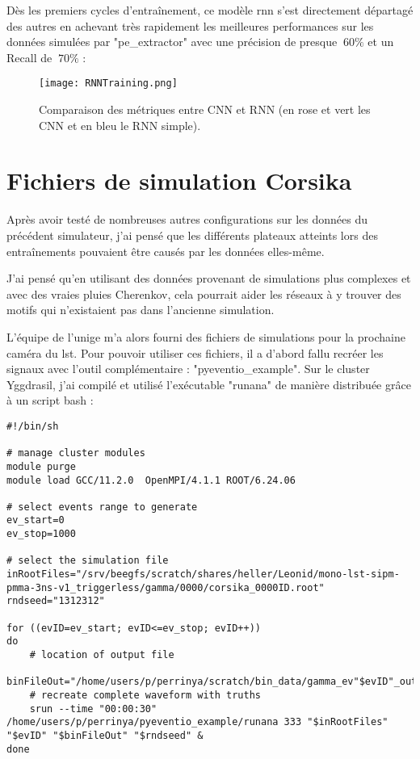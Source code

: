 Dès les premiers cycles d'entraînement, ce modèle \gls{rnn} s'est directement départagé des autres en achevant
très rapidement les meilleures performances sur les données simulées par "pe\_extractor" avec une précision de 
presque $~60\%$ et un Recall de $~70\%$ :
\newpage
\begin{figure}[tbph!]
	\centering
	\texttt{[image: RNNTraining.png]}
	\caption[Comparaison des métriques entre CNN et RNN]{Comparaison des métriques entre CNN et RNN (en rose et vert les CNN et en bleu le RNN simple).}
\end{figure}

\section{Fichiers de simulation Corsika}
Après avoir testé de nombreuses autres configurations sur les données du précédent simulateur, j'ai pensé que 
les différents plateaux atteints lors des entraînements pouvaient être causés par les données elles-même.

J'ai pensé qu'en utilisant des données provenant de simulations plus complexes et 
avec des vraies pluies Cherenkov, cela pourrait aider les réseaux à y trouver des 
motifs qui n'existaient pas dans l'ancienne simulation.

L'équipe de l'\gls{unige} m'a alors fourni des fichiers de simulations pour la prochaine caméra du \gls{lst}.
Pour pouvoir utiliser ces fichiers, il a d'abord fallu recréer les signaux avec l'outil complémentaire : "pyeventio\_example".
Sur le cluster Yggdrasil, j'ai compilé et utilisé l'exécutable "runana" de manière distribuée grâce à un script bash :

\begin{lstlisting}[language=iBash,caption={Script de génération des signaux à partir de fichier de simulations, data/slurm-run.sh},captionpos=b]
#!/bin/sh

# manage cluster modules
module purge
module load GCC/11.2.0  OpenMPI/4.1.1 ROOT/6.24.06

# select events range to generate
ev_start=0
ev_stop=1000

# select the simulation file
inRootFiles="/srv/beegfs/scratch/shares/heller/Leonid/mono-lst-sipm-pmma-3ns-v1_triggerless/gamma/0000/corsika_0000ID.root"
rndseed="1312312"

for ((evID=ev_start; evID<=ev_stop; evID++))
do
	# location of output file
	binFileOut="/home/users/p/perrinya/scratch/bin_data/gamma_ev"$evID"_out.bin"
	# recreate complete waveform with truths
	srun --time "00:00:30" /home/users/p/perrinya/pyeventio_example/runana 333 "$inRootFiles" "$evID" "$binFileOut" "$rndseed" &
done
\end{lstlisting}

